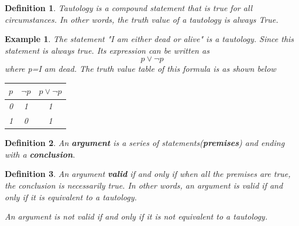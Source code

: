 \documentclass{article}
\newtheorem{definition}{Definition}
\newtheorem{ex}{Example}
\begin{document}
\begin{definition}
Tautology is a compound statement that is true for all circumstances. In other words, the truth value of a tautology is always True.
\end{definition}

\begin{ex}
	The statement "I am either dead or alive" is a tautology. Since this statement is always true. Its expression can be written as 
	\[ p\vee \neg p \]
	where p=I am dead. The truth value table of this formula is as shown below
	
	
	\begin{center}
		\begin{tabular}{|c|c|c|}
		\hline 
		$p$ & $\neg p$ & $p\vee \neg p$  \\ 
		\hline 
		0 & 1 & 1 \\ 
		\hline 
		1 & 0 & 1 \\ 
		\hline 
	\end{tabular}
	\end{center} 
\end{ex}

\begin{definition}
	An \textbf{argument} is a series of statements(\textbf{premises}) and ending with a \textbf{conclusion}.
\end{definition}

\begin{definition}
	An argument \textbf{valid} if and only if when all the premises are true, the conclusion is necessarily true. In other words, an argument is valid if and only if it is equivalent to a tautology.
	
	An argument is not valid if and only if it is not equivalent to a tautology.    
\end{definition}
\end{document}
